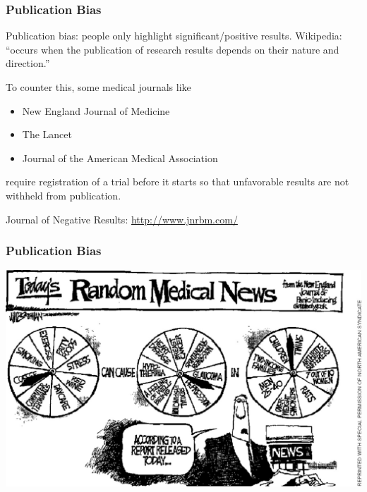 \documentclass[handout]{beamer}
\newcommand{\blue}[1]{\textcolor{blue2}{#1}}
\begin{document}
\begin{frame}[fragile]
\frametitle{Publication Bias}
\blue{Publication bias}: people only highlight significant/positive results.  \pause Wikipedia: ``occurs when the publication of research results \blue{depends on their nature and direction}.''

\vspace{0.5cm}

\pause To counter this, some medical journals like
\begin{itemize}
\item New England Journal of Medicine
\item The Lancet
\item Journal of the American Medical Association
\end{itemize}
\pause require registration of a trial \blue{before} it starts so that unfavorable results are not withheld from publication. 

\vspace{0.5cm}

\pause Journal of \blue{Negative Results}:  \blue{\url{http://www.jnrbm.com/}}

\end{frame}


\begin{frame}[fragile]
\frametitle{Publication Bias}

\begin{center}
\includegraphics[width=\textwidth]{figure/wheel.jpg}
\end{center}
\end{frame}
\end{document}
